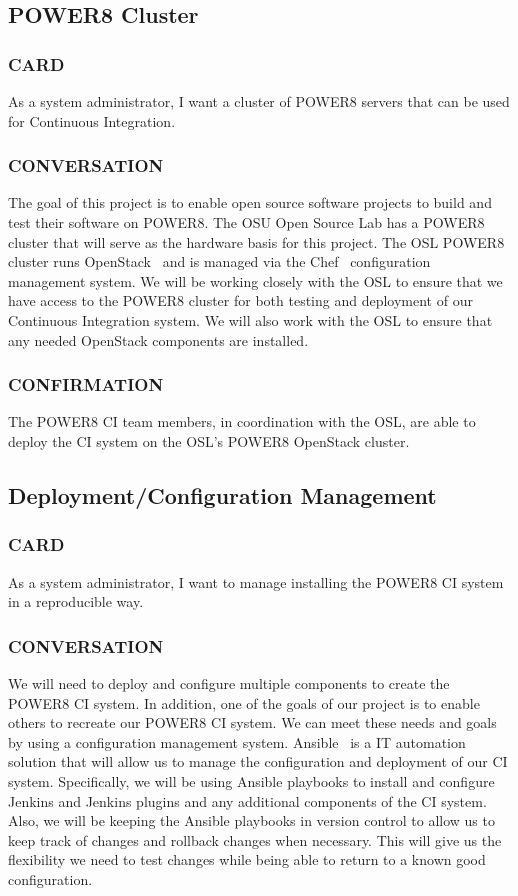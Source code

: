 \documentclass[10pt,letterpaper,onecolumn,journal]{IEEEtran}
\begin{document}
\subsection{POWER8 Cluster}
\subsubsection{CARD}
As a system administrator, I want a cluster of POWER8 servers that can be used for Continuous Integration.
\subsubsection{CONVERSATION}
The goal of this project is to enable open source software projects to build and test their software on POWER8.
The OSU Open Source Lab has a POWER8 cluster that will serve as the hardware basis for this project.
The OSL POWER8 cluster runs OpenStack~\cite{openstackmain} and is managed via the Chef~\cite{chefmain} configuration management system.
We will be working closely with the OSL to ensure that we have access to the POWER8 cluster for both testing and deployment of our Continuous Integration system.
We will also work with the OSL to ensure that any needed OpenStack components are installed.
\subsubsection{CONFIRMATION}
The POWER8 CI team members, in coordination with the OSL, are able to deploy the CI system on the OSL's POWER8 OpenStack cluster.

\subsection{Deployment/Configuration Management}
\subsubsection{CARD}
As a system administrator, I want to manage installing the POWER8 CI system in a reproducible way.
\subsubsection{CONVERSATION}
We will need to deploy and configure multiple components to create the POWER8 CI system.
In addition, one of the goals of our project is to enable others to recreate our POWER8 CI system.
We can meet these needs and goals by using a configuration management system.
Ansible~\cite{ansiblemain} is a IT automation solution that will allow us to manage the configuration and deployment of our CI system.
Specifically, we will be using Ansible playbooks to install and configure Jenkins and Jenkins plugins and any additional components of the CI system.
Also, we will be keeping the Ansible playbooks in version control to allow us to keep track of changes and rollback changes when necessary.
This will give us the flexibility we need to test changes while being able to return to a known good configuration.
\end{document}
